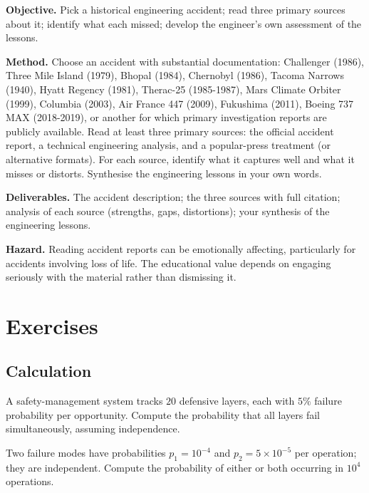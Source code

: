 \begin{project}
\textbf{Objective.} Pick a historical engineering accident; read three primary sources about it; identify what each missed; develop the engineer's own assessment of the lessons.

\textbf{Method.} Choose an accident with substantial documentation: Challenger (1986), Three Mile Island (1979), Bhopal (1984), Chernobyl (1986), Tacoma Narrows (1940), Hyatt Regency (1981), Therac-25 (1985-1987), Mars Climate Orbiter (1999), Columbia (2003), Air France 447 (2009), Fukushima (2011), Boeing 737 MAX (2018-2019), or another for which primary investigation reports are publicly available. Read at least three primary sources: the official accident report, a technical engineering analysis, and a popular-press treatment (or alternative formats). For each source, identify what it captures well and what it misses or distorts. Synthesise the engineering lessons in your own words.

\textbf{Deliverables.} The accident description; the three sources with full citation; analysis of each source (strengths, gaps, distortions); your synthesis of the engineering lessons.

\textbf{Hazard.} Reading accident reports can be emotionally affecting, particularly for accidents involving loss of life. The educational value depends on engaging seriously with the material rather than dismissing it.
\end{project}

\section{Exercises}

\subsection*{Calculation}

\begin{exercise}
A safety-management system tracks $20$ defensive layers, each with $5\%$ failure probability per opportunity. Compute the probability that all layers fail simultaneously, assuming independence.
\end{exercise}

\begin{exercise}
Two failure modes have probabilities $p_1 = 10^{-4}$ and $p_2 = 5 \times 10^{-5}$ per operation; they are independent. Compute the probability of either or both occurring in $10^4$ operations.
\end{exercise}

